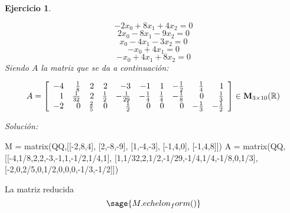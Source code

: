 \documentclass[12pt]{amsart}
\newtheorem{ejer}{Ejercicio}
\begin{document}
\begin{ejer}
\begin{minipage}{\textwidth}
\begin{tcolorbox}[colback = red!20!white,title=Versión Ecuaciones Implícitas]
\[ -2 x_{0} + 8 x_{1} + 4 x_{2} = 0 \]
\[ 2 x_{0} - 8 x_{1} - 9 x_{2} = 0 \]
\[ x_{0} - 4 x_{1} - 3 x_{2} = 0 \]
\[ -x_{0} + 4 x_{1} = 0 \]
\[ -x_{0} + 4 x_{1} + 8 x_{2} = 0 \]
Siendo $A$ la matriz que se da a continuación:
\end{tcolorbox}
\end{minipage}
\[ A = \left[\begin{array}{rrrrrrrrrr}
-4 & \frac{1}{8} & 2 & 2 & -3 & -1 & 1 & -\frac{1}{2} & \frac{1}{4} & 1 \\
1 & \frac{1}{32} & 2 & \frac{1}{2} & -\frac{1}{29} & -\frac{1}{4} & \frac{1}{4} & -\frac{1}{8} & 0 & \frac{1}{3} \\
-2 & 0 & \frac{2}{5} & 0 & \frac{1}{2} & 0 & 0 & 0 & -\frac{1}{3} & -\frac{1}{2}
\end{array}\right] \in {\bf M}_{3\times 10}({\mathbb R})\]
\end{ejer}

{\it Soluci\'on:}

\begin{sageblock}
M = matrix(QQ,[[-2,8,4],
[2,-8,-9],
[1,-4,-3],
[-1,4,0],
[-1,4,8]])
A = matrix(QQ,[[-4,1/8,2,2,-3,-1,1,-1/2,1/4,1],
[1,1/32,2,1/2,-1/29,-1/4,1/4,-1/8,0,1/3],
[-2,0,2/5,0,1/2,0,0,0,-1/3,-1/2]])
\end{sageblock}

La matriz reducida
$$
	\sage{M.echelon_form()}
$$

\begin{align*}
	
\end{align*}

\end{document}

